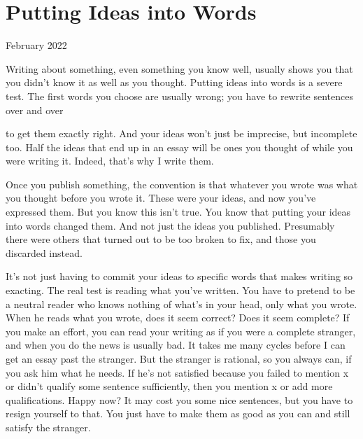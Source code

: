 \chapter{Putting Ideas into Words}


            
              
                

February 2022

Writing about something, even
                  something you know well, usually shows you that you didn't
                  know it as well as you thought. Putting ideas into words is a
                  severe test. The first words you choose are usually wrong; you
                  have to rewrite sentences over and over
                  
                  to get them exactly right. And your ideas won't just be
                  imprecise, but incomplete too. Half the ideas that end up in
                  an essay will be ones you thought of while you were writing
                  it. Indeed, that's why I write them.

Once you
                  publish something, the convention is that whatever you wrote
                  was what you thought before you wrote it. These were your
                  ideas, and now you've expressed them. But you know this isn't
                  true. You know that putting your ideas into words changed
                  them. And not just the ideas you published. Presumably there
                  were others that turned out to be too broken to fix, and those
                  you discarded instead.

It's not just having to
                  commit your ideas to specific words that makes writing so
                  exacting. The real test is reading what you've written. You
                  have to pretend to be a neutral reader who knows nothing of
                  what's in your head, only what you wrote. When he reads what
                  you wrote, does it seem correct? Does it seem complete? If you
                  make an effort, you can read your writing as if you were a
                  complete stranger, and when you do the news is usually bad. It
                  takes me many cycles before I can get an essay past the
                  stranger. But the stranger is rational, so you always can, if
                  you ask him what he needs. If he's not satisfied because you
                  failed to mention x or didn't qualify some sentence
                  sufficiently, then you mention x or add more qualifications.
                  Happy now? It may cost you some nice sentences, but you have
                  to resign yourself to that. You just have to make them as good
                  as you can and still satisfy the stranger.


